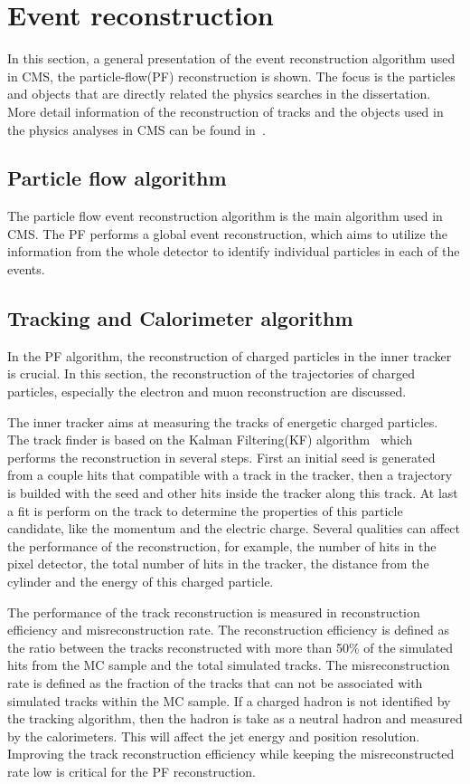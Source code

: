 \section{Event reconstruction}
In this section, a general presentation of the event reconstruction algorithm used in CMS, the particle-flow(PF) reconstruction is shown. The focus is the particles and objects that are directly related the physics searches in the dissertation. More detail information of the reconstruction of tracks and the objects  used in the physics analyses in CMS can be found in~\cite{CMS-PRF-14-001}.  
\subsection{Particle flow algorithm}

The particle flow event reconstruction algorithm is the main algorithm used in CMS. The PF performs a global event reconstruction, which aims to utilize the information from the whole detector to identify individual particles in each of the events.



\subsection{Tracking and Calorimeter algorithm}\label{PFtracker}

In the PF algorithm, the reconstruction of charged particles in the inner tracker is crucial. In this section, the reconstruction of the trajectories of charged particles, especially the electron and muon reconstruction are discussed. 

The inner tracker aims at measuring the tracks of energetic charged particles. The track finder is based on the Kalman Filtering(KF) algorithm~\cite{tracker:algo} which performs the reconstruction in several steps. First an initial seed is generated from a couple hits that compatible with a track in the tracker, then a trajectory is builded with the seed and other hits inside the tracker along this track. At last a fit is perform on the track  to determine the properties of this particle candidate, like the momentum and the electric charge. Several qualities can affect the performance of the reconstruction, for example,  the number of hits in the pixel detector, the total number of hits in the tracker, the distance from the cylinder and the energy of this charged particle. 

The performance of the track reconstruction is measured in reconstruction efficiency and misreconstruction rate. The reconstruction efficiency is defined as the ratio between the tracks reconstructed with more than 50\% of the simulated hits from the MC sample and the total simulated tracks. The misreconstruction rate is defined as the fraction of the tracks that can not be associated with simulated tracks within the MC sample.  If a charged hadron is not identified by the tracking algorithm, then the hadron is take as a neutral hadron and measured by the calorimeters. This will affect the jet energy and position resolution. Improving the track reconstruction efficiency while keeping the misreconstructed rate low is critical for the PF reconstruction.

